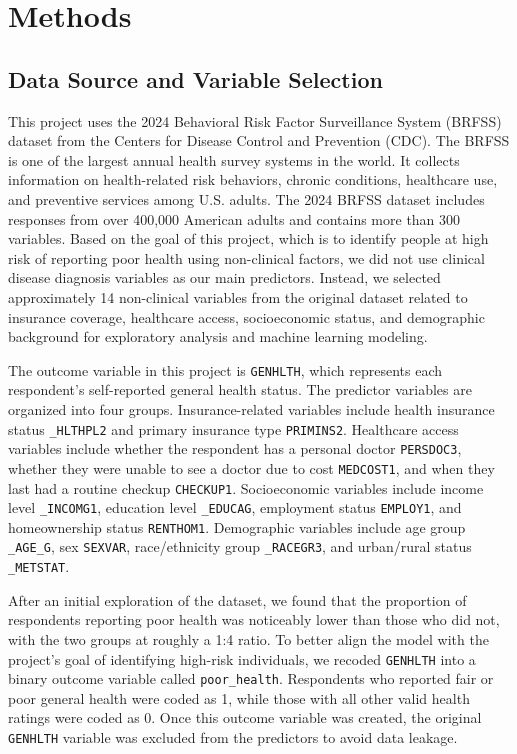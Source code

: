 \section{Methods}

\subsection{Data Source and Variable Selection}

This project uses the 2024 Behavioral Risk Factor Surveillance System (BRFSS) dataset from the Centers for Disease Control and Prevention (CDC). The BRFSS is one of the largest annual health survey systems in the world. It collects information on health-related risk behaviors, chronic conditions, healthcare use, and preventive services among U.S. adults. The 2024 BRFSS dataset includes responses from over 400,000 American adults and contains more than 300 variables. Based on the goal of this project, which is to identify people at high risk of reporting poor health using non-clinical factors, we did not use clinical disease diagnosis variables as our main predictors. Instead, we selected approximately 14 non-clinical variables from the original dataset related to insurance coverage, healthcare access, socioeconomic status, and demographic background for exploratory analysis and machine learning modeling.

The outcome variable in this project is \texttt{GENHLTH}, which represents each respondent's self-reported general health status. The predictor variables are organized into four groups. Insurance-related variables include health insurance status \texttt{\_HLTHPL2} and primary insurance type \texttt{PRIMINS2}. Healthcare access variables include whether the respondent has a personal doctor \texttt{PERSDOC3}, whether they were unable to see a doctor due to cost \texttt{MEDCOST1}, and when they last had a routine checkup \texttt{CHECKUP1}. Socioeconomic variables include income level \texttt{\_INCOMG1}, education level \texttt{\_EDUCAG}, employment status \texttt{EMPLOY1}, and homeownership status \texttt{RENTHOM1}. Demographic variables include age group \texttt{\_AGE\_G}, sex \texttt{SEXVAR}, race/ethnicity group \texttt{\_RACEGR3}, and urban/rural status \texttt{\_METSTAT}.

After an initial exploration of the dataset, we found that the proportion of respondents reporting poor health was noticeably lower than those who did not, with the two groups at roughly a 1:4 ratio. To better align the model with the project's goal of identifying high-risk individuals, we recoded \texttt{GENHLTH} into a binary outcome variable called \texttt{poor\_health}. Respondents who reported fair or poor general health were coded as 1, while those with all other valid health ratings were coded as 0. Once this outcome variable was created, the original \texttt{GENHLTH} variable was excluded from the predictors to avoid data leakage.

